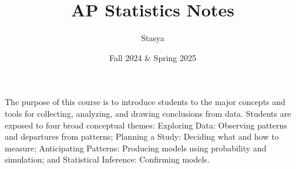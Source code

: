 \documentclass[10pt,a4paper,oneside]{book}
\title{AP Statistics Notes}
\author{Stasya}
\date{Fall 2024 \& Spring 2025}
\begin{document}
\maketitle
\bigbreak
\begin{center}
    The purpose of this course is to introduce students to the major concepts and tools for collecting, analyzing, and drawing 
    conclusions from data. Students are exposed to four broad conceptual themes: Exploring Data: Observing patterns and departures 
    from patterns; Planning a Study: Deciding what and how to measure; Anticipating Patterns: Producing models using probability 
    and simulation; and Statistical Inference: Confirming models.
\end{center}
\bigbreak
\tableofcontents









\end{document}
